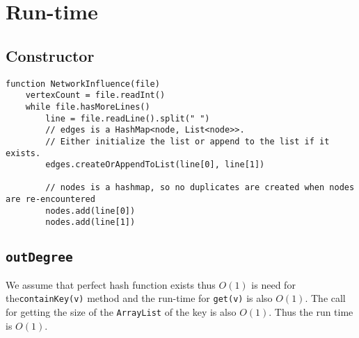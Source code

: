 \documentclass[10pt,letterpaper]{article}
\begin{document}
\section{Run-time}
\subsection{Constructor}
\begin{verbatim}
function NetworkInfluence(file)
    vertexCount = file.readInt()
    while file.hasMoreLines()
        line = file.readLine().split(" ")
        // edges is a HashMap<node, List<node>>.
        // Either initialize the list or append to the list if it exists.
        edges.createOrAppendToList(line[0], line[1])
        
        // nodes is a hashmap, so no duplicates are created when nodes are re-encountered
        nodes.add(line[0])
        nodes.add(line[1])
\end{verbatim}
\subsection{\texttt{outDegree}}
We assume that perfect hash function exists thus $O(1)$ is need for the\texttt{containKey(v)} method and the run-time for \texttt{get(v)} is also $O(1)$. The call for getting the size of the \texttt{ArrayList} of the key is also $O(1)$.
Thus the run time is $O(1)$.
\end{document}
